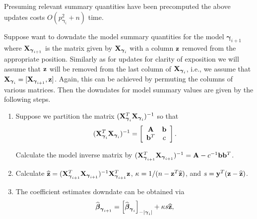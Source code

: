 \documentclass[12pt]{article}
\def\vectorfontone{\bf}
\def\vectorfonttwo{\boldsymbol}
\def\vb{{\vectorfontone b}}                      %
\def\vy{{\vectorfontone y}}                      %
\def\vz{{\vectorfontone z}}                      %
\def\vbeta{{\vectorfonttwo \beta}}               %
\def\vgamma{{\vectorfonttwo \gamma}}             %
\def\matrixfontone{\bf}
\def\mA{{\matrixfontone A}}                      %
\def\mX{{\matrixfontone X}}                      %
\def\ds{\displaystyle}
\begin{document}
\noindent Presuming relevant summary quantities have been precomputed
the above updates costs $O(p_{\vgamma_{i}}^2 + n)$ time.

Suppose want to downdate the model summary quantities for the model
$\vgamma_{i+1}$ where $\mX_{\vgamma_{i+1}}$ is the matrix given by 
$\mX_{\vgamma_i}$ with a column $\vz$ removed from the appropriate position.
Similarly as for updates for clarity of exposition we will assume that
$\vz$ will be removed from the last column of $\mX_{\vgamma_i}$, i.e., we assume that
$\mX_{\vgamma_{i}} = [\mX_{\vgamma_{i+1}}, \vz]$. 
Again, this can be achieved by permuting the columns of various matrices.
Then the downdates for model summary values are given by the following steps.
\begin{enumerate}
	\item 
	Suppose we partition the matrix
	$(\mX_{\vgamma_{i}}^T\mX_{\vgamma_{i}})^{-1}$ so that
	$$
	\ds (\mX_{\vgamma_{i}}^T\mX_{\vgamma_{i}})^{-1} 
	= \left[ \begin{array}{cc}
	\mA   & \vb \\
	\vb^T & c \\
	\end{array} \right].
	$$
	
	\noindent Calculate the model inverse matrix  
	by   $(\mX_{\vgamma_{i+1}}^T\mX_{\vgamma_{i+1}})^{-1} = \mA - c^{-1}\vb\vb^T$.
	
	\item Calculate
	$\widehat{\vz} = (\mX_{\vgamma_{i+1}}^T\mX_{\vgamma_{i+1}})^{-1}\mX_{\vgamma_{i+1}}^T\vz$,
	$\kappa = 1/(n - \vz^T\widehat{\vz})$,
	and $s = \vy^T(\vz - \widehat{\vz})$.
	
	\item 
	The coefficient estimates downdate can be obtained
	via
	$$
	\widehat{\vbeta}_{\vgamma_{i+1}} = \left[ \widehat{\vbeta}_{\vgamma_{i}} \right]_{-|{\vgamma_{i}}|} + \kappa s\widehat{\vz},
	$$
	

\end{enumerate}
\end{document}
